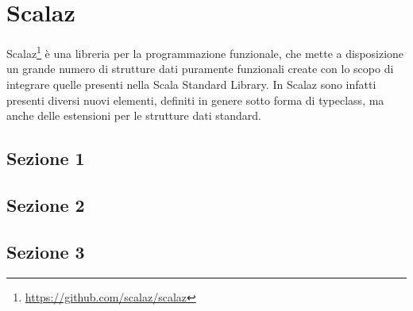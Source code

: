 \chapter{Scalaz} %

\label{Chapter1} %

Scalaz\footnote{\url{https://github.com/scalaz/scalaz}} è una libreria per la programmazione funzionale, che mette a disposizione un grande numero di strutture dati puramente funzionali create con lo scopo di integrare quelle presenti nella Scala Standard Library. In Scalaz sono infatti presenti diversi nuovi elementi, definiti in genere sotto forma di typeclass, ma anche delle estensioni per le strutture dati standard.



\section{Sezione 1}


\section{Sezione 2}


\section{Sezione 3}
